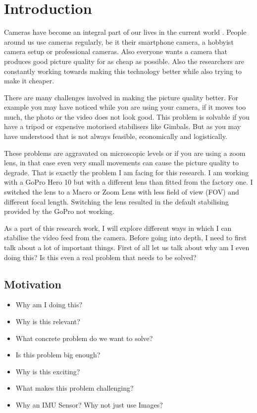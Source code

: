 \chapter{Introduction} \label{chapter_one}

Cameras have become an integral part of our lives in the current world  \citet{ibad2022}. People around us use cameras regularly, be it their smartphone camera, a hobbyist camera setup or professional cameras. Also everyone wants a camera that produces good picture quality for as cheap as possible. Also the researchers are constantly working towards making this technology better while also trying to make it cheaper.

There are many challenges involved in making the picture quality better. For example you may have noticed while you are using your camera, if it moves too much, the photo or the video does not look good. This problem is solvable if you have a tripod or expensive motorised stabilisers like Gimbals. But as you may have understood that is not always feasible, economically and logistically.

These problems are aggravated on microscopic levels or if you are using a zoom lens, in that case even very small movements can cause the picture quality to degrade. That is exactly the problem I am facing for this research. I am working with a GoPro Hero 10 but with a different lens than fitted from the factory one. I switched the lens to a Macro or Zoom Lens with less field of view (FOV) and different focal length. Switching the lens resulted in the default stabilising provided by the GoPro not working.

As a part of this research work, I will explore different ways in which I can stabilise the video feed from the camera. Before going into depth, I need to first talk about a lot of important things. First of all let us talk about why am I even doing this? Is this even a real problem that needs to  be solved?

\section{Motivation}
\begin{itemize}
\item Why am I doing this?
\item Why is this relevant?
\item What concrete problem do we want to solve?
\item Is this problem big enough?

\item Why is this exciting?
\item What makes this problem challenging?
\item Why an IMU Sensor? Why not just use Images?
\end{itemize}

